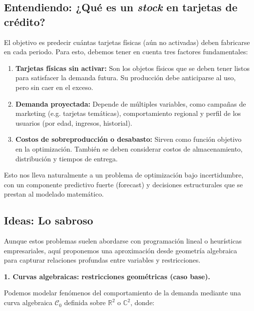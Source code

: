 \subsection*{Entendiendo: ¿Qué es un \textit{stock} en tarjetas de crédito?}

El objetivo es predecir cuántas tarjetas físicas (aún no activadas) deben fabricarse en cada periodo. Para esto, debemos tener en cuenta tres factores fundamentales:

\begin{enumerate}
	\item \textbf{Tarjetas físicas sin activar:} Son los objetos físicos que se deben tener listos para satisfacer la demanda futura. Su producción debe anticiparse al uso, pero sin caer en el exceso.
	
	\item \textbf{Demanda proyectada:} Depende de múltiples variables, como campañas de marketing (e.g. tarjetas temáticas), comportamiento regional y perfil de los usuarios (por edad, ingresos, historial).
	
	\item \textbf{Costos de sobreproducción o desabasto:} Sirven como función objetivo en la optimización. También se deben considerar costos de almacenamiento, distribución y tiempos de entrega.
\end{enumerate}

Esto nos lleva naturalmente a un problema de optimización bajo incertidumbre, con un componente predictivo fuerte (forecast) y decisiones estructurales que se prestan al modelado matemático.

\vspace{0.5cm}

\subsection*{Ideas: Lo sabroso}

Aunque estos problemas suelen abordarse con programación lineal o heurísticas empresariales, aquí proponemos una aproximación desde geometría algebraica para capturar relaciones profundas entre variables y restricciones.

\vspace{0.3cm}

\textbf{1. Curvas algebraicas: restricciones geométricas (caso base).}

Podemos modelar fenómenos del comportamiento de la demanda mediante una curva algebraica $\mathcal{C}_0$ definida sobre $\mathbb{R}^2$ o $\mathbb{C}^2$, donde:

